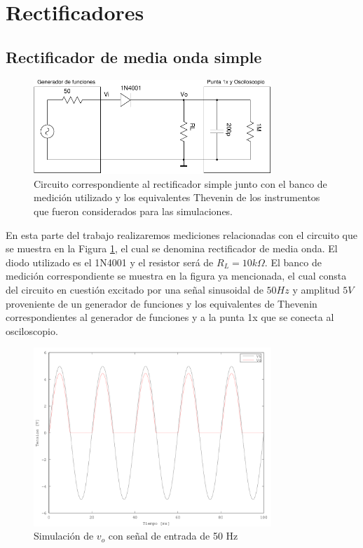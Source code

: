 \section{Rectificadores}
\label{sec:rect}
\subsection{Rectificador de media onda simple}
\begin{figure}[H]
  \centering
      \includegraphics[width=0.8\textwidth]{gfxsantiago/FIG_CIRC_Rectificador_Simple_A.pdf}
  \caption{Circuito correspondiente al rectificador simple junto con el banco de medición utilizado y los equivalentes Thevenin de los instrumentos que fueron considerados para las simulaciones.}
  \label{fig:circ_3A}
\end{figure}
En esta parte del trabajo realizaremos mediciones relacionadas con el circuito que se muestra en la Figura \ref{fig:circ_3A}, el cual se denomina rectificador de media onda. El diodo utilizado es el 1N4001 y el resistor será de $R_{L} = 10 k\Omega$. El banco de medición correspondiente se muestra en la figura ya mencionada, el cual consta del circuito en cuestión excitado por una señal sinusoidal de $50Hz$ y amplitud $5V$ proveniente de un generador de funciones y los equivalentes de Thevenin correspondientes al generador de funciones y a la punta 1x que se conecta al osciloscopio.\\

\begin{figure}[H]
  \centering
      \includegraphics[width=0.8\textwidth]{gfxsantiago/FIG_SIM_Rectificador_Simple_3A1.png}
  \caption{Simulación de $v_{o}$ con señal de entrada de 50 Hz}
\end{figure}

